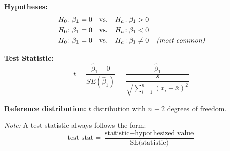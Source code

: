 \begin{tcolorbox}[
  colback=yellow!5,
  colframe=yellow!50!black,
  title={Hypothesis Test on the Slope $\beta_1$},
  boxrule=0.4pt, sharp corners, breakable
]

\textbf{Hypotheses:}
\begin{align*}
H_0\!: \beta_1 = 0 \quad & \text{vs.} \quad H_a\!: \beta_1 > 0 \\
H_0\!: \beta_1 = 0 \quad & \text{vs.} \quad H_a\!: \beta_1 < 0 \\
H_0\!: \beta_1 = 0 \quad & \text{vs.} \quad H_a\!: \beta_1 \neq 0 \quad \text{\textit{(most common)}}
\end{align*}

\vspace{0.75em}
\textbf{Test Statistic:}
\[
t = \frac{\hat{\beta}_1 - 0}{SE(\hat{\beta}_1)} = \frac{\hat{\beta}_1}{\dfrac{s}{\sqrt{\sum_{i=1}^n (x_i - \bar{x})^2}}}
\]

\vspace{0.75em}
\textbf{Reference distribution:} $t$ distribution with $n - 2$ degrees of freedom.

\vspace{1em}
\textit{Note:} A test statistic always follows the form:
\[
\text{test stat} = \frac{\text{statistic} - \text{hypothesized value}}{\text{SE(statistic)}}
\]

\end{tcolorbox}

